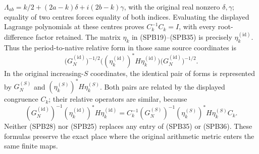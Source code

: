 \(\Lambda_{ab}=k/2+(2a-k)\delta+i(2b-k)\gamma\), with the
original real nonzero \(\delta,\gamma\); equality of two
centres forces equality of both indices.  Evaluating the displayed
Lagrange polynomials at these centres proves \(C_k^{-1}C_k=I\),
with every root-difference factor retained.
The matrix \(\eta_k\) in (SPB19)--(SPB35) is precisely
\(\eta_k^{(\mathrm{id})}\).
Thus the period-to-native relative form in those same source
coordinates is
\[
 \bigl(G_N^{(\mathrm{id})}\bigr)^{-1/2}
 \bigl((\eta_k^{(\mathrm{id})})^*H\eta_k^{(\mathrm{id})}\bigr)
 \bigl(G_N^{(\mathrm{id})}\bigr)^{-1/2}.
 \tag{SPB36}
\]
In the original increasing-\(S\) coordinates, the identical
pair of forms is represented by
\(G_N^{(S)}\) and
\((\eta_k^{(S)})^*H\eta_k^{(S)}\).
Both pairs are related by the displayed congruence \(C_k\);
their relative operators are similar, because
\[
 (G_N^{(\mathrm{id})})^{-1}
   (\eta_k^{(\mathrm{id})})^*H\eta_k^{(\mathrm{id})}
 =
 C_k^{-1}(G_N^{(S)})^{-1}
   (\eta_k^{(S)})^*H\eta_k^{(S)}C_k .
\]
Neither (SPB28) nor (SPB25) replaces any entry of (SPB35)
or (SPB36).  These formulas preserve the exact place where
the original arithmetic metric enters the same finite maps.
